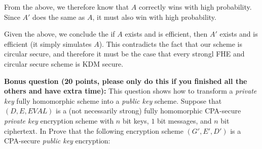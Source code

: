 \documentclass{article}
\begin{document}
\begin{enumerate}[,label=\alph*.]
\begin{mdbmarginx}{1ex}{0pt}{1ex}{0pt}
\noindent{}From the above, we therefore know that $A$ correctly wins with high probability. Since $A'$ does the
same as $A$, it must also win with high probability.%

Given the above, we conclude the if $A$ exists and is efficient, then $A'$ exists and is efficient (it 
simply simulates $A$).
This contradicts the fact that our scheme is circular secure, and therefore it must be the case 
that every strongl FHE and circular secure scheme is KDM secure.%
\end{mdbmarginx}%
\end{enumerate}%

\noindent{}\textbf{Bonus question (20 points, please only do this if you finished all the others and have extra time):}
This question shows how to transform a \emph{private key} fully homomorphic scheme into a \emph{public key} scheme.
Suppose that $(D,E,EVAL)$ is a (not necessarily strong) fully homomorphic  CPA-secure \emph{private key} encryption scheme with $n$ bit keys, $1$ bit messages, and $n$ bit ciphertext. In Prove that the following encryption scheme $(G',E',D')$ is a CPA-secure \emph{public key} encryption:%
\end{document}
